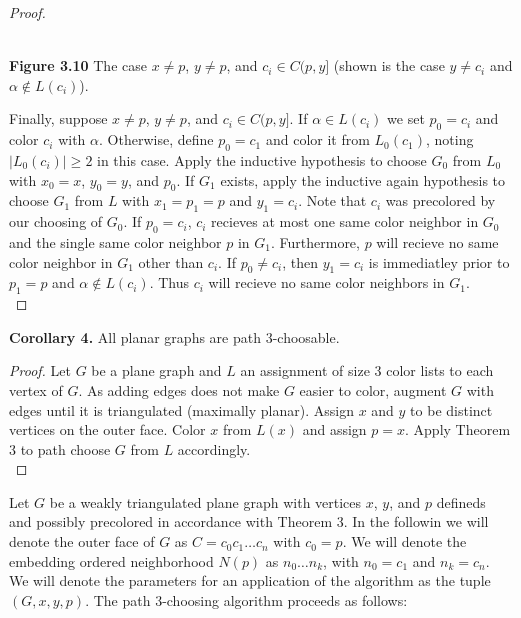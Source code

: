 \documentclass[11pt,letter]{article}
\begin{document}
\begin{proof}
\begin{center}
\hfill\\
\textbf{Figure 3.10} The case $x\ne p$, $y\ne p$, and $c_i\in C(p,y]$ (shown is the case $y\ne c_i$ and
$\alpha\not\in L(c_i)$).
\end{center}

\noindent Finally, suppose $x\ne p$, $y\ne p$, and $c_i\in C(p,y]$. If
$\alpha\in L(c_i)$ we set $p_0=c_i$ and color $c_i$ with $\alpha$. Otherwise, define $p_0=c_1$ and color it from
$L_0(c_1)$, noting $|L_0(c_i)|\ge 2$ in this case. Apply the inductive hypothesis to
choose $G_0$ from $L_0$ with $x_0=x$, $y_0=y$, and $p_0$. If $G_1$ exists, apply the inductive again
hypothesis to choose $G_1$ from $L$ with $x_1=p_1=p$ and $y_1=c_i$. Note that $c_i$ was precolored by our
choosing of $G_0$. If $p_0=c_i$, $c_i$ recieves at most one same
color neighbor in $G_0$ and the single same color neighbor $p$ in $G_1$. Furthermore, $p$ will recieve no
same color neighbor in $G_1$ other than $c_i$. If $p_0\ne c_i$, then $y_1=c_i$ is immediatley prior to
$p_1=p$ and $\alpha\not\in L(c_i)$. Thus $c_i$ will recieve no same color neighbors in $G_1$.\\
\end{proof}

\begin{adjustwidth}{1.5em}{1.5em}
\noindent\textbf{Corollary 4.} All planar graphs are path $3$-choosable.\\
\end{adjustwidth}

\begin{proof}
Let $G$ be a plane graph and $L$ an assignment of size $3$ color lists to each vertex of $G$. As adding edges does
not make $G$ easier to color, augment $G$ with edges until it is triangulated (maximally planar).
Assign $x$ and $y$ to be distinct vertices on the outer face. Color $x$ from $L(x)$
and assign $p=x$. Apply Theorem 3 to path choose $G$ from $L$ accordingly.\\
\end{proof}

\noindent Let $G$ be a weakly triangulated plane graph with vertices $x$, $y$, and $p$ defineds and possibly
precolored in accordance with Theorem 3. In the followin we will denote the outer face of $G$ as
$C=c_0c_1\ldots c_n$ with $c_0=p$.
We will denote the embedding ordered neighborhood $N(p)$ as $n_0\ldots n_k$, with $n_0=c_1$ and
$n_k=c_n$. We will denote the parameters for an application of the algorithm as the tuple $(G, x, y, p)$.
The path $3$-choosing algorithm proceeds as follows:
\end{document}
